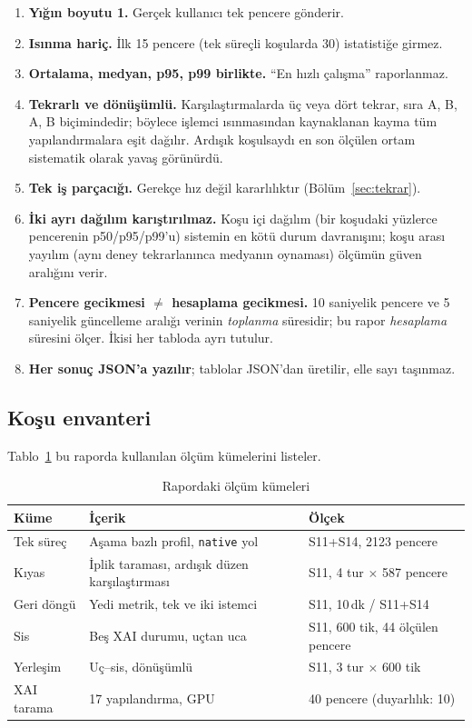 \documentclass[conference]{IEEEtran}
\begin{document}
\begin{enumerate}
\item \textbf{Yığın boyutu 1.} Gerçek kullanıcı tek pencere gönderir.
\item \textbf{Isınma hariç.} İlk 15 pencere (tek süreçli koşularda 30)
istatistiğe girmez.
\item \textbf{Ortalama, medyan, p95, p99 birlikte.} ``En hızlı çalışma''
raporlanmaz.
\item \textbf{Tekrarlı ve dönüşümlü.} Karşılaştırmalarda üç veya dört tekrar,
sıra A, B, A, B biçimindedir; böylece işlemci ısınmasından kaynaklanan kayma
tüm yapılandırmalara eşit dağılır. Ardışık koşulsaydı en son ölçülen ortam
sistematik olarak yavaş görünürdü.
\item \textbf{Tek iş parçacığı.} Gerekçe hız değil kararlılıktır
(Bölüm~\ref{sec:tekrar}).
\item \textbf{İki ayrı dağılım karıştırılmaz.} Koşu içi dağılım (bir koşudaki
yüzlerce pencerenin p50/p95/p99'u) sistemin en kötü durum davranışını; koşu arası
yayılım (aynı deney tekrarlanınca medyanın oynaması) ölçümün güven aralığını
verir.
\item \textbf{Pencere gecikmesi $\ne$ hesaplama gecikmesi.} 10 saniyelik pencere
ve 5 saniyelik güncelleme aralığı verinin \emph{toplanma} süresidir; bu rapor
\emph{hesaplama} süresini ölçer. İkisi her tabloda ayrı tutulur.
\item \textbf{Her sonuç JSON'a yazılır}; tablolar JSON'dan üretilir, elle sayı
taşınmaz.
\end{enumerate}

\subsection{Koşu envanteri}

Tablo~\ref{tab:kosular} bu raporda kullanılan ölçüm kümelerini listeler.

\begin{table}[t]
\caption{Rapordaki ölçüm kümeleri}
\label{tab:kosular}
\centering
\small
\begin{tabular}{p{1.5cm}p{3.0cm}p{2.6cm}}
\toprule
\textbf{Küme} & \textbf{İçerik} & \textbf{Ölçek}\\
\midrule
Tek süreç & Aşama bazlı profil, \texttt{native} yol & S11+S14, 2123 pencere\\
Kıyas & İplik taraması, ardışık düzen karşılaştırması & S11, 4 tur $\times$ 587 pencere\\
Geri döngü & Yedi metrik, tek ve iki istemci & S11, 10\,dk / S11+S14\\
Sis & Beş XAI durumu, uçtan uca & S11, 600 tik, 44 ölçülen pencere\\
Yerleşim & Uç--sis, dönüşümlü & S11, 3 tur $\times$ 600 tik\\
XAI tarama & 17 yapılandırma, GPU & 40 pencere (duyarlılık: 10)\\
\bottomrule
\end{tabular}
\end{table}
\end{document}
